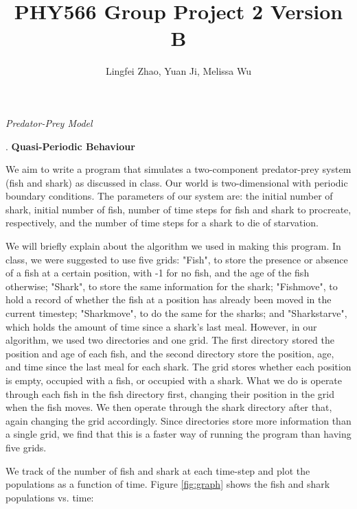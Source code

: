\documentclass{article}
\begin{document}
\title{PHY566 Group Project 2 Version B}
\author{Lingfei Zhao, Yuan Ji, Melissa Wu}
\maketitle

\begin{center}
\textit{\large Predator-Prey Model}\par
\end{center}
\bigskip
{}. \textbf{Quasi-Periodic Behaviour}\par
\smallskip
We aim to write a program that simulates a two-component predator-prey system (fish and shark) as discussed in class. Our world is two-dimensional with periodic boundary conditions. The parameters of our system are: the initial number of shark, initial number of fish, number of time steps for fish and shark to procreate, respectively, and the number of time steps for a shark to die of starvation.\par
We will briefly explain about the algorithm we used in making this program. In class, we were suggested to use five grids: "Fish", to store the presence or absence of a fish at a certain position, with -1 for no fish, and the age of the fish otherwise; "Shark", to store the same information for the shark; "Fishmove", to hold a record of whether the fish at a position has already been moved in the current timestep; "Sharkmove", to do the same for the sharks; and "Sharkstarve", which holds the amount of time since a shark's last meal. However, in our algorithm, we used two directories and one grid. The first directory stored the position and age of each fish, and the second directory store the position, age, and time since the last meal for each shark. The grid stores whether each position is empty, occupied with a fish, or occupied with a shark. What we do is operate through each fish in the fish directory first, changing their position in the grid when the fish moves. We then operate through the shark directory after that, again changing the grid accordingly. Since directories store more information than a single grid, we find that this is a faster way of running the program than having five grids.\par 
We track of the number of fish and shark at each time-step and plot the populations as a function of time. Figure \ref{fig:graph} shows the fish and shark populations vs. time:\par
\end{document}
